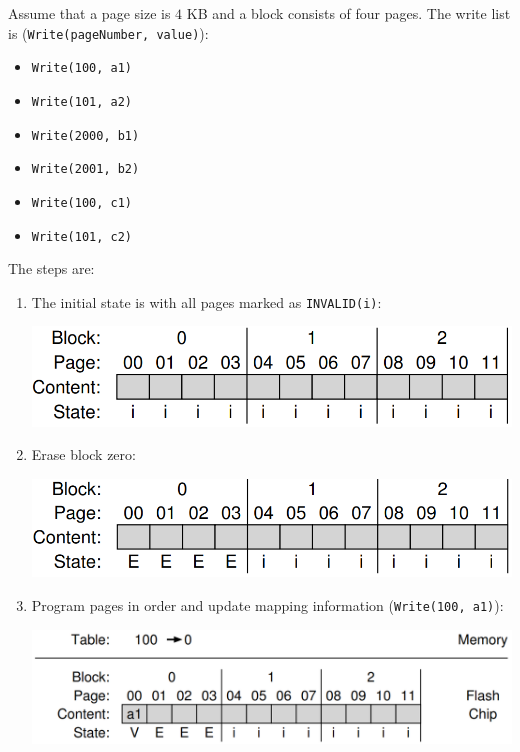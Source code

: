 \begin{examplebox}
    Assume that a page size is $4$ KB and a block consists of four pages. The write list is (\texttt{Write(pageNumber, value)}):
    \begin{itemize}
        \item \texttt{Write(100, a1)}
        \item \texttt{Write(101, a2)}
        \item \texttt{Write(2000, b1)}
        \item \texttt{Write(2001, b2)}
        \item \texttt{Write(100, c1)}
        \item \texttt{Write(101, c2)}
    \end{itemize}
    The steps are:
    \begin{enumerate}
        \item The initial state is with all pages marked as \texttt{INVALID(i)}:
        \begin{center}
            \includegraphics[width=.7\textwidth]{img/log-structured-ftl-1.png}
        \end{center}

        \item Erase block zero:
        \begin{center}
            \includegraphics[width=.7\textwidth]{img/log-structured-ftl-2.png}
        \end{center}

        \item Program pages in order and update mapping information (\texttt{Write(100, a1)}):
        \begin{center}
            \includegraphics[width=.8\textwidth]{img/log-structured-ftl-3.png}
        \end{center}


\end{enumerate}
\end{examplebox}
